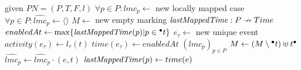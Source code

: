 \begin{algorithmic}
\Require given $PN = (P,T,F,l)$
\State $\forall p\in P: lmc_p \gets$ new locally mapped case
\State $\forall p\in P: \hat{lmc}_p \gets \langle \rangle$
\State $M \gets$ new empty marking
\State $\mathit{lastMappedTime}: P \nrightarrow Time$
         
            \State {}
         
                \State {}
            \EndIf
         
            \If{$M[t\rangle$}
                \State $enabledAt \gets \max\{ \mathit{lastMappedTime}(p)| p\in {^{\bullet}t} \}$
                \State $e_{\tau} \gets$ new unique event
                \State $activity(e_{\tau}) \gets l_{\tau}(t)$
                \State $time(e_{\tau}) \gets enabledAt$
               \State {}
            \EndIf
        \EndIf
    \EndFor
    \State \Return $(lmc_p)_{p\in P}$
\EndFunction
{}
    \State $M \gets (M \setminus {^{\bullet}t}) \uplus t^{\bullet}$
        \State $\hat{lmc}_p \gets \hat{lmc}_p \cdot (e,t)$
            \State $\mathit{lastMappedTime}(p) \gets time(e)$    
        \EndIf
    \EndFor
\EndFunction
\end{algorithmic}